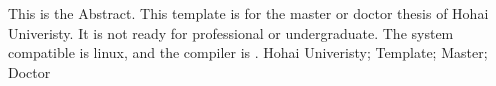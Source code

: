 %
{%
    This is the Abstract. This template is for the master or doctor thesis of Hohai Univeristy. It is not ready for professional or undergraduate.
    The system compatible is linux, and the compiler is \LaTeXe .
}%
{%
    Hohai Univeristy; Template; Master; Doctor
}
